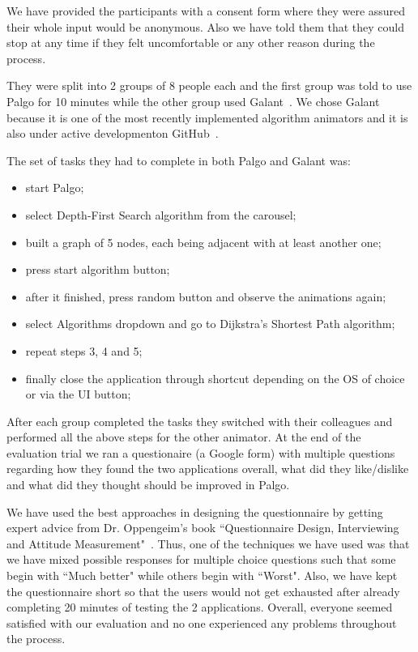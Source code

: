\documentclass{l4proj}
\begin{document}
We have provided the participants with a consent form where they were assured their whole input would be anonymous.
Also we have told them that they could stop at any time if they felt uncomfortable or any other reason during the
process.

They were split into 2 groups of 8 people each and the first group was told to use Palgo for 10 minutes while the
other group used Galant~\cite{galant}. We chose Galant because it is one of the most recently implemented algorithm
animators and it is also under active developmenton GitHub~\cite{galant-github}.

The set of tasks they had to complete in both Palgo and Galant was:

\begin{itemize}
  \item start Palgo;
  \item select Depth-First Search algorithm from the carousel;
  \item built a graph of 5 nodes, each being adjacent with at least another one;
  \item press start algorithm button;
  \item after it finished, press random button and observe the animations again;
  \item select Algorithms dropdown and go to Dijkstra's Shortest Path algorithm;
  \item repeat steps 3, 4 and 5;
  \item finally close the application through shortcut depending on the OS of choice or via the UI button;
\end{itemize}

After each group completed the tasks they switched with their colleagues and performed all the above steps for the other
animator. At the end of the evaluation trial we ran a questionaire (a Google form) with multiple questions regarding how
they found the two applications overall, what did they like/dislike and what did they thought should be improved in
Palgo. 

We have used the best approaches in designing the questionnaire by getting expert advice from Dr. Oppengeim's book
``Questionnaire Design, Interviewing and Attitude Measurement"~\cite{questionnaire-design}. Thus, one of the techniques
we have used was that we have mixed possible
responses for multiple choice questions such that some begin with ``Much better" while others begin with ``Worst". Also, we have
kept the questionnaire short so that the users would not get exhausted after already completing 20 minutes of testing
the 2 applications. Overall, everyone seemed satisfied with our evaluation and no one experienced any problems throughout the process.
\end{document}
